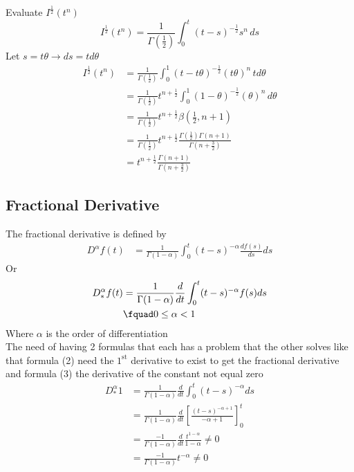 \begin{example}
    Evaluate $I^{ \frac{1}{2}}(t^{n})$\\
    \[
        I^{ \frac{1}{2}}(t^{n}) = \frac{1}{\Gamma{(\frac{1}{2})}} \int_0^t (t-s)^{ -\frac{1}{2}} s^n \, ds
    \]
    Let $s=t\theta \rightarrow ds=t d\theta$
    \begin{align*}
        I^{ \frac{1}{2}}(t^{n}) & = \frac{1}{\Gamma{(\frac{1}{2})}} \int_0^1 (t-t\theta)^{-\frac{1}{2}} (t\theta)^n \, td\theta                            \\
                                          & = \frac{1}{\Gamma{(\frac{1}{2})}} t^{n+\frac{1}{2}} \int_0^1 (1-\theta)^{-\frac{1}{2}} (\theta)^n \, d\theta             \\
                                          & = \frac{1}{\Gamma{(\frac{1}{2})}} t^{n+\frac{1}{2}} \beta{(\frac{1}{2},n+1)}                                             \\
                                          & = \frac{1}{\Gamma{(\frac{1}{2})}} t^{n+\frac{1}{2}}\frac{\Gamma{(\frac{1}{2})\Gamma{(n+1)} } }{\Gamma{(n+\frac{3}{2})} } \\
                                          & =  t^{n+\frac{1}{2}}\frac{\Gamma{(n+1)} } {\Gamma{(n+\frac{3}{2})} } 
    \end{align*}
\end{example}

\subsection{Fractional Derivative}
The fractional derivative is defined by
\begin{align}
    D^{\alpha}f(t) & = \frac{1}{\Gamma(1-\alpha)}\int_{0}^{t}(t-s)^{-\alpha}\frac{d f(s)}{ds}ds
\end{align}
Or
\begin{align}
    D_*^{\alpha}f(t) & = \frac{1}{\Gamma(1-\alpha)}\frac{d}{dt}\int_{0}^{t}(t-s)^{-\alpha}f(s)ds
    \\\notag
                     & \fquad0\leq \alpha < 1
\end{align}
Where $\alpha$ is the order of differentiation
\\
The need of having 2 formulas that each has a problem that the other solves
like that formula (2) need the $1^{\text{st}}$ derivative to exist to get the fractional derivative
and formula (3) the derivative of the constant not equal zero
\begin{align*}
    D_*^{\alpha} 1 & = \frac{1}{\Gamma(1-\alpha)}\frac{d}{dt}\int_{0}^{t}(t-s)^{-\alpha}ds
    \\
                    & = \frac{1}{\Gamma(1-\alpha)}\frac{d}{dt} \left[\frac{(t-s)^{-\alpha+1}}{-\alpha+1}\right]_{0}^{t}
    \\
                    & = \frac{-1}{\Gamma(1-\alpha)} \frac{d}{dt} \frac{t^{1-\alpha}}{1-\alpha} \neq 0
    \\
                    & = \frac{-1}{\Gamma(1-\alpha)} t^{-\alpha} \neq 0
\end{align*}

